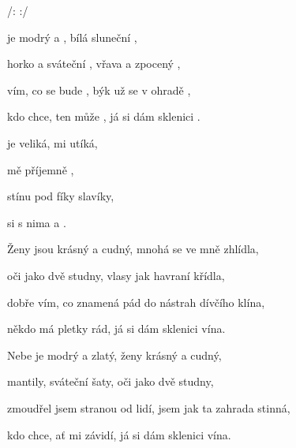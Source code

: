 

/:     :/

\zs
{} je modrý a , bílá sluneční ,

horko a sváteční , vřava a zpocený ,

vím, co se bude , býk už se v ohradě ,

kdo chce, ten může , já si dám sklenici .  
\ks

\zr
{} je veliká,  mi utíká,

 mě příjemně , 

 stínu pod fíky  slavíky,

 si s nima a . 
\kr

\zs
Ženy jsou krásný a cudný, mnohá se ve mně zhlídla,

oči jako dvě studny, vlasy jak havraní křídla,

dobře vím, co znamená pád do nástrah dívčího klína,

někdo má pletky rád, já si dám sklenici vína.
\ks

\zr  \kr

\zs
Nebe je modrý a zlatý, ženy krásný a cudný,

mantily, sváteční šaty, oči jako dvě studny,

zmoudřel jsem stranou od lidí, jsem jak ta zahrada stinná,

kdo chce, ať mi závidí, já si dám sklenici vína.
\ks

\zr  \kr

\kp





















